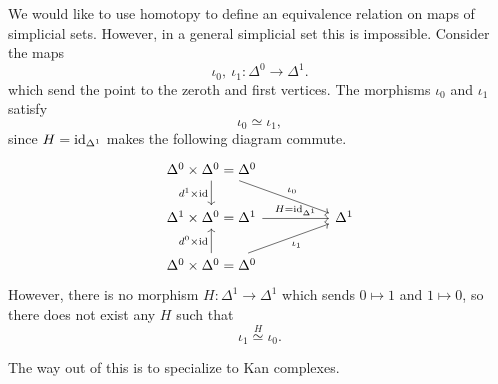 \documentclass[main.tex]{subfiles}
\begin{document}
We would like to use homotopy to define an equivalence relation on maps of simplicial sets. However, in a general simplicial set this is impossible. Consider the maps
\begin{equation*}
  \iota_{0},\ \iota_{1}\colon \Delta^{0} \to \Delta^{1}.
\end{equation*}
which send the point to the zeroth and first vertices. The morphisms $\iota_{0}$ and $\iota_{1}$ satisfy
\begin{equation*}
  \iota_{0} \simeq  \iota_{1},
\end{equation*}
since $H = \mathrm{id}_{\Delta^{1}}$ makes the following diagram commute.
\begin{equation*}
  \begin{tikzcd}[column sep=huge]
    \Delta^{0} \times \Delta^{0} = \Delta^{0}
    \arrow[d, swap, "d^{1} \times \id"]
    \arrow[rd, "\iota_{0}"]
    \\
    \Delta^{1} \times \Delta^{0} = \Delta^{1}
    \arrow[r, "H = \id_{\Delta^{1}}"]
    & \Delta^{1}
    \\
    \Delta^{0} \times \Delta^{0} = \Delta^{0}
    \arrow[ru, swap, "\iota_{1}"]
    \arrow[u, "d^{0} \times \id"]
  \end{tikzcd}
\end{equation*}
However, there is no morphism $H\colon \Delta^{1} \to \Delta^{1}$ which sends $0 \mapsto 1$ and $1 \mapsto 0$, so there does not exist any $H$ such that
\begin{equation*}
  \iota_{1} \overset{H}{\simeq} \iota_{0}.
\end{equation*}

The way out of this is to specialize to Kan complexes.
\end{document}
